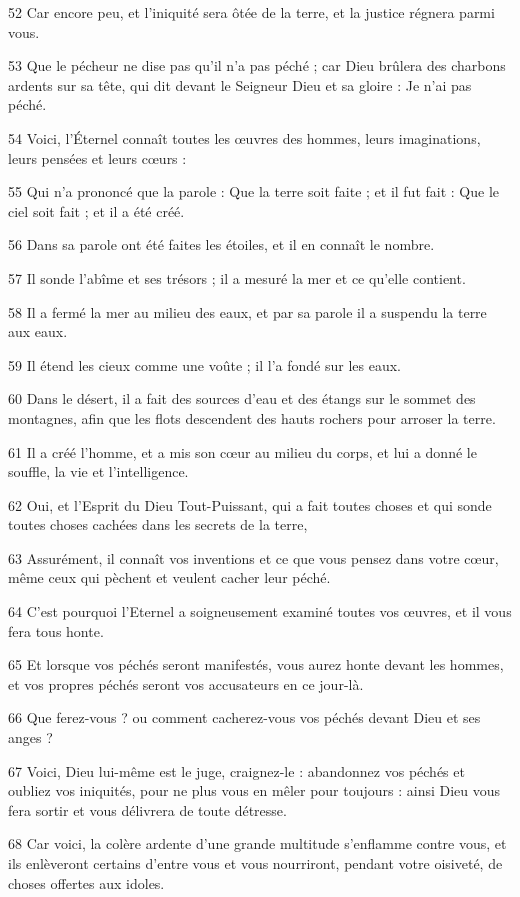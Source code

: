 \par 52 Car encore peu, et l'iniquité sera ôtée de la terre, et la justice régnera parmi vous.
\par 53 Que le pécheur ne dise pas qu'il n'a pas péché ; car Dieu brûlera des charbons ardents sur sa tête, qui dit devant le Seigneur Dieu et sa gloire : Je n'ai pas péché.
\par 54 Voici, l'Éternel connaît toutes les œuvres des hommes, leurs imaginations, leurs pensées et leurs cœurs :
\par 55 Qui n'a prononcé que la parole : Que la terre soit faite ; et il fut fait : Que le ciel soit fait ; et il a été créé.
\par 56 Dans sa parole ont été faites les étoiles, et il en connaît le nombre.
\par 57 Il sonde l'abîme et ses trésors ; il a mesuré la mer et ce qu'elle contient.
\par 58 Il a fermé la mer au milieu des eaux, et par sa parole il a suspendu la terre aux eaux.
\par 59 Il étend les cieux comme une voûte ; il l'a fondé sur les eaux.
\par 60 Dans le désert, il a fait des sources d'eau et des étangs sur le sommet des montagnes, afin que les flots descendent des hauts rochers pour arroser la terre.
\par 61 Il a créé l'homme, et a mis son cœur au milieu du corps, et lui a donné le souffle, la vie et l'intelligence.
\par 62 Oui, et l'Esprit du Dieu Tout-Puissant, qui a fait toutes choses et qui sonde toutes choses cachées dans les secrets de la terre,
\par 63 Assurément, il connaît vos inventions et ce que vous pensez dans votre cœur, même ceux qui pèchent et veulent cacher leur péché.
\par 64 C'est pourquoi l'Eternel a soigneusement examiné toutes vos œuvres, et il vous fera tous honte.
\par 65 Et lorsque vos péchés seront manifestés, vous aurez honte devant les hommes, et vos propres péchés seront vos accusateurs en ce jour-là.
\par 66 Que ferez-vous ? ou comment cacherez-vous vos péchés devant Dieu et ses anges ?
\par 67 Voici, Dieu lui-même est le juge, craignez-le : abandonnez vos péchés et oubliez vos iniquités, pour ne plus vous en mêler pour toujours : ainsi Dieu vous fera sortir et vous délivrera de toute détresse.
\par 68 Car voici, la colère ardente d'une grande multitude s'enflamme contre vous, et ils enlèveront certains d'entre vous et vous nourriront, pendant votre oisiveté, de choses offertes aux idoles.
